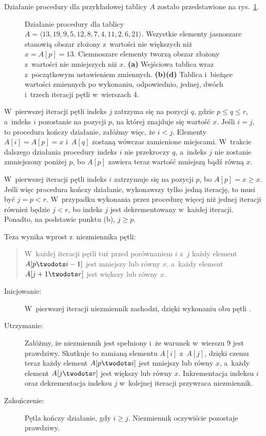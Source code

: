 
\subproblem %
Działanie procedury  dla przykładowej tablicy $A$ zostało przedstawione na rys.\ \ref{fig:7-1a}.
\begin{figure}[!ht]
	\centering 
	\caption{Działanie procedury  dla tablicy $A=\langle13,19,9,5,12,8,7,4,11,2,6,21\rangle$.
Wszystkie elementy jasnoszare stanowią obszar złożony z~wartości nie większych niż $x=A[p]=13$.
Ciemnoszare elementy tworzą obszar złożony z~wartości nie mniejszych niż $x$.
{\sffamily\bfseries(a)} Wejściowa tablica wraz z~początkowym ustawieniem zmiennych.
{\sffamily\bfseries(b)\nbendash(d)} Tablica i~bieżące wartości zmiennych po wykonaniu, odpowiednio, jednej, dwóch i~trzech iteracji pętli  w~wierszach 4.} \label{fig:7-1a}
\end{figure}

\subproblem %
W~pierwszej iteracji pętli  indeks $j$ zatrzyma się na pozycji $q$, gdzie $p\le q\le r$, a~indeks $i$ pozostanie na pozycji $p$, na której znajduje się wartość $x$.
Jeśli $i=j$, to procedura kończy działanie, załóżmy więc, że $i<j$.
Elementy $A[i]=A[p]=x$ i~$A[q]$ zostaną wówczas zamienione miejscami.
W~trakcie dalszego działania procedury indeks $i$ nie przekroczy $q$, a~indeks $j$ nie zostanie zmniejszony poniżej $p$, bo $A[p]$ zawiera teraz wartość mniejszą bądź równą $x$.

\subproblem %

\noindent W~pierwszej iteracji pętli  indeks $i$ zatrzymuje się na pozycji $p$, bo $A[p]=x\ge x$.
Jeśli więc procedura kończy działanie, wykonawszy tylko jedną iterację, to musi być $j=p<r$.
W~przypadku wykonania przez procedurę więcej niż jednej iteracji również będzie $j<r$, bo indeks $j$ jest dekrementowany w~każdej iteracji.
Ponadto, na podstawie punktu (b), $j\ge p$.

\subproblem %
Teza wynika wprost z~niezmiennika pętli:
\begin{quote}
W~każdej iteracji pętli  tuż przed porównaniem $i$ z~$j$ każdy element $A[p\twodots i-1]$ jest mniejszy lub równy $x$, a~każdy element $A[j+1\twodots r]$ jest większy lub równy $x$.
\end{quote}
\begin{description}
	\item[Inicjowanie:] W~pierwszej iteracji niezmiennik zachodzi, dzięki wykonaniu obu pętli .
	\item[Utrzymanie:] Załóżmy, że niezmiennik jest spełniony i~że warunek w~wierszu 9 jest prawdziwy.
Skutkuje to zamianą elementu $A[i]$ z~$A[j]$, dzięki czemu teraz każdy element $A[p\twodots i]$ jest mniejszy lub równy $x$, a~każdy element $A[j\twodots r]$ jest większy lub równy $x$.
Inkrementacja indeksu $i$ oraz dekrementacja indeksu $j$ w~kolejnej iteracji przywraca niezmiennik.
	\item[Zakończenie:] Pętla kończy działanie, gdy $i\ge j$.
Niezmiennik oczywiście pozostaje prawdziwy.
\end{description}


